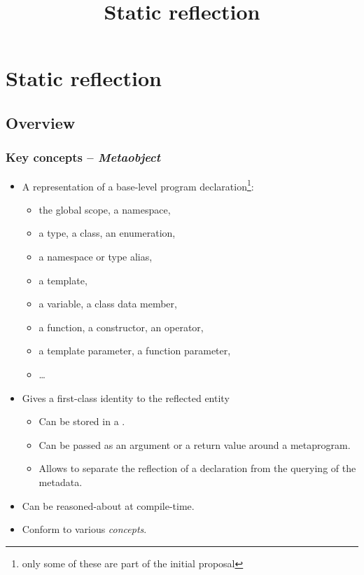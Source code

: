 \documentclass[compress,table,xcolor=table]{beamer}
\begin{document}
\title{Static reflection}
\section{Static reflection}

\subsection{Overview}

\begin{frame}
\frametitle{Key concepts -- {\em Metaobject}}
  \begin{itemize}
    \small
    \item A representation of a base-level program declaration\footnote
      {only some of these are part of the initial proposal}:
    \begin{itemize}
      \scriptsize
      \item the global scope, a namespace,
      \item a type, a class, an enumeration,
      \item a namespace or type alias,
      \item a template,
      \item a variable, a class data member,
      \item a function, a constructor, an operator,
      \item a template parameter, a function parameter,
      \item \ldots
    \end{itemize}
    \item Gives a first-class identity to the reflected entity
    \begin{itemize}
      \scriptsize
      \item Can be stored in a .
      \item Can be passed as an argument or a return value around a metaprogram.
      \item Allows to separate the reflection of a declaration from
      the querying of the metadata.
    \end{itemize}
    \item Can be reasoned-about at compile-time.
    \item Conform to various {\em concepts}.
  \end{itemize}
\end{frame}
\end{document}
